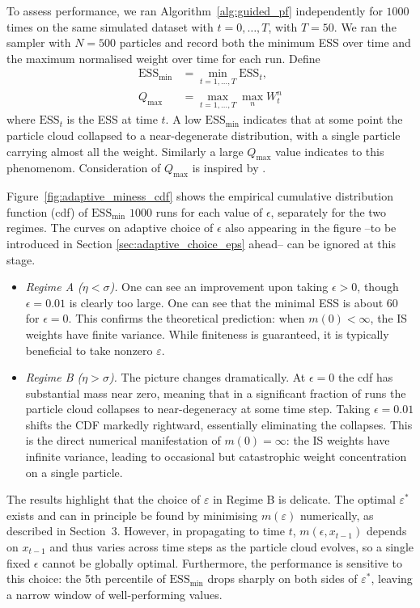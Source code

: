 \documentclass[11pt,reqno]{amsart}
\newcommand{\eps}{\varepsilon}
\theoremstyle{definition}
\begin{document}
%
To assess performance, we ran Algorithm~\ref{alg:guided_pf} independently for  $1000$
times on the same simulated dataset with $t=0,\ldots, T$, with $T=50$. We ran the sampler with $N=500$ particles   and record both the minimum
ESS over time and the maximum normalised weight over time for each run. Define
\begin{align*}
  \mathrm{ESS}_{\min} &= \min_{t=1,\ldots,T} \mathrm{ESS}_t,	\\
  Q_{\max} &= \max_{t=1,\ldots,T} \max_n W^n_t
\end{align*}
where $\mathrm{ESS}_t$ is the ESS at time $t$. 
 A low $\mathrm{ESS}_{\min}$ indicates that at some point the
particle cloud collapsed to a near-degenerate distribution, with a single
particle carrying almost all the weight. Similarly a large $Q_{\max}$ value indicates to this phenomenom. Consideration of $Q_{\max}$ is inspired by \cite{chatterjee2018sample}.  


Figure~\ref{fig:adaptive_miness_cdf} shows the empirical cumulative distribution function (cdf) of $\mathrm{ESS}_{\min}$
 $1000$  runs for each value of $\epsilon$, separately for the two
regimes. The curves on adaptive choice of $\epsilon$ also appearing in the figure --to be introduced in Section \ref{sec:adaptive_choice_eps} ahead--  can be ignored at this stage. 
\begin{itemize}
	\item {\it Regime A ($\eta < \sigma$).}
One can see an improvement upon taking $\epsilon>0$, though $\epsilon=0.01$ is clearly too large. One can see that the minimal ESS is about $60$ for $\epsilon=0$.   This confirms the
theoretical prediction: when $m(0)<\infty$, the IS weights have finite
variance.  While finiteness is guaranteed, it is typically beneficial to take nonzero $\eps$. 

\item {\it Regime B ($\eta > \sigma$).}
The picture changes dramatically. At $\epsilon=0$ the cdf has substantial
mass near zero, meaning that in a significant fraction of runs the particle
cloud collapses to near-degeneracy at some time step. Taking 
$\epsilon=0.01$ shifts the CDF markedly rightward, essentially eliminating
the collapses. This is the direct numerical manifestation of $m(0)=\infty$:
the IS weights have infinite variance, leading to occasional but catastrophic
weight concentration on a single particle.
\end{itemize}
The results highlight that the choice of $\varepsilon$ in Regime B is
delicate. The optimal $\varepsilon^*$ exists and can in principle be found by
minimising $m(\varepsilon)$ numerically, as described in Section~3. However, in propagating to time $t$, 
$m(\epsilon, x_{t-1})$ depends on $x_{t-1}$ and thus varies across time steps as the particle
cloud evolves, so a single fixed $\epsilon$ cannot be globally optimal.
Furthermore, the performance is sensitive to this choice: the 5th percentile
of $\mathrm{ESS}_{\min}$ drops sharply on both sides of $\varepsilon^*$,
leaving a narrow window of well-performing values.
\end{document}
